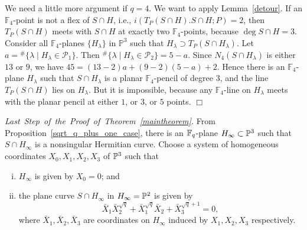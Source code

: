\documentclass[a4paper,11pt]{article}
\newcommand{\qed}{\hfill \mbox{$  \Box $}}
\newcommand{\ssgyokan}{\vskip 4pt}
\begin{document}
We need a little more argument if $q=4$.
We want to apply Lemma~\ref{detour}.
If an $\mathbb{F}_4$-point is not a flex of $S\cap H$,
i.e., $i(T_P(S\cap H). S\cap H; P)=2$,
then $T_P(S\cap H)$ meets with $S\cap H$
at exactly two  $\mathbb{F}_4$-points, because
$\deg S\cap H=3$.
Consider all $\mathbb{F}_4$-planes $\{ H_{\lambda} \}$
in $\mathbb{P}^3$ such that $ H_{\lambda}  \supset T_P(S\cap H_{\lambda}). $
Let $a = {}^{\#}\{ \lambda \mid H_{\lambda} \in \mathcal{P}_1 \}$.
Then ${}^{\#}\{ \lambda \mid H_{\lambda} \in \mathcal{P}_2 \}= 5-a$.
Since $N_4(S \cap H_{\lambda} )$ is either $13$ or $9$,
we have
$ 45 = (13-2)a +(9-2)(5-a) +2$.
Hence there is an $\mathbb{F}_4$-plane $ H_{\lambda} $
such that $S \cap H_{\lambda}$
is a planar $\mathbb{F}_4$-pencil of degree $3$,
and the line $T_{P}(S \cap H)$ lies on $H_{\lambda}$.
But it is impossible, because any $\mathbb{F}_4$-line
on $H_{\lambda}$ meets with the planar pencil at either
$1$, or $3$, or $5$ points.
\qed

\ssgyokan


\noindent 
\mbox{\em Last Step of the Proof of Theorem~\ref{maintheorem}.\hspace*{2mm}}
From Proposition~\ref{sqrt_q_plus_one_case},
there is an ${\Bbb F}_q$-plane $H_{\infty} \subset {\Bbb P}^3$
such that $S \cap H_{\infty}$ is a nonsingular
Hermitian curve.
Choose a system of homogeneous coordinates
$X_0, X_1, X_2, X_3$ of ${\Bbb P}^3$
such that
\begin{enumerate}[(i)]
\item $H_{\infty}$ is given by $X_0=0$; and
\item the plane curve $S \cap H_{\infty}$ in $H_{\infty}={\Bbb P}^2$
is given by
\[
\bar{X}_1 \bar{X}_2^{\sqrt{q}} + \bar{X}_1^{\sqrt{q}} \bar{X}_2
 + \bar{X}_3^{\sqrt{q}+1} =0,
\]
where $\bar{X}_1, \bar{X}_2, \bar{X}_3$ are coordinates
on $H_{\infty}$ induced by $X_1, X_2, X_3$ respectively.
\end{enumerate}
\end{document}
